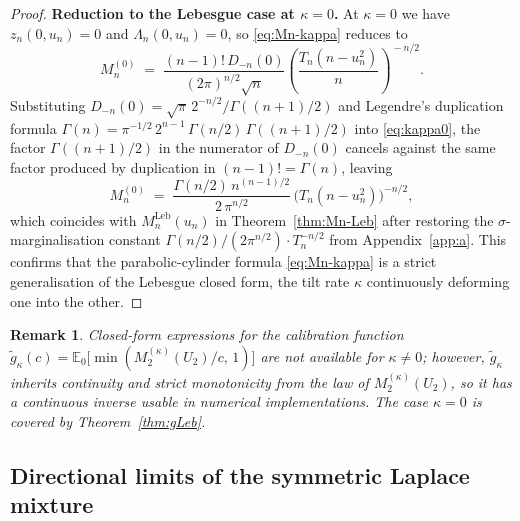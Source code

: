 \documentclass[numsec,webpdf,modern,medium,namedate]{oup-authoring-template}
\theoremstyle{thmstyleone}%
\theoremstyle{thmstyletwo}%
\newtheorem{remark}{Remark}%
\theoremstyle{thmstylethree}%
\newcommand{\E}{\mathbb{E}}
\newcommand{\Leb}{\mathrm{Leb}}
\newcommand{\1}{\mathbf{1}}
\begin{document}
\begin{proof}
\textbf{Reduction to the Lebesgue case at $\kappa=0$.}
\quad
At $\kappa=0$ we have $z_n(0,u_n)=0$ and $\Lambda_n(0,u_n)=0$, so
\eqref{eq:Mn-kappa} reduces to
\begin{equation}\label{eq:kappa0}
  M_n^{(0)}
  \;=\;\frac{(n-1)!\,D_{-n}(0)}{(2\pi)^{n/2}\sqrt n}
  \!\left(\frac{T_n(n-u_n^2)}{n}\right)^{\!-n/2}.
\end{equation}
Substituting $D_{-n}(0)=\sqrt\pi\,2^{-n/2}/\Gamma((n+1)/2)$ and
Legendre's duplication formula
$\Gamma(n)=\pi^{-1/2}\,2^{n-1}\,\Gamma(n/2)\,\Gamma((n+1)/2)$ into
\eqref{eq:kappa0}, the factor $\Gamma((n+1)/2)$ in the numerator of
$D_{-n}(0)$ cancels against the same factor produced by duplication in
$(n-1)!=\Gamma(n)$, leaving
\[
  M_n^{(0)}
  \;=\;\frac{\Gamma(n/2)\,n^{(n-1)/2}}{2\,\pi^{n/2}}
  \,\bigl(T_n(n-u_n^2)\bigr)^{-n/2},
\]
which coincides with $M_n^{\Leb}(u_n)$ in Theorem~\ref{thm:Mn-Leb} after
restoring the $\sigma$-marginalisation constant
$\Gamma(n/2)/(2\pi^{n/2})\cdot T_n^{-n/2}$ from Appendix~\ref{app:a}. This
confirms that the parabolic-cylinder formula \eqref{eq:Mn-kappa} is a
strict generalisation of the Lebesgue closed form, the tilt rate
$\kappa$ continuously deforming one into the other.
\end{proof}

\begin{remark}
Closed-form expressions for the calibration function
\(\widetilde g_\kappa(c)=\E_0\bigl[\min(M_2^{(\kappa)}(U_2)/c,\,1)\bigr]\)
are not available for \(\kappa\neq 0\); however,
\(\widetilde g_\kappa\) inherits continuity and strict monotonicity
from the law of \(M_2^{(\kappa)}(U_2)\), so it has a continuous
inverse usable in numerical implementations. The case \(\kappa=0\) is
covered by Theorem~\ref{thm:gLeb}.
\end{remark}

\subsection{Directional limits of the symmetric Laplace mixture}
\label{sec:laplace-limits}
\end{document}
